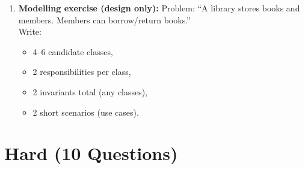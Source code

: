 \documentclass[11pt,a4paper]{article}
\begin{document}
\begin{enumerate}[label=M\arabic*., leftmargin=*]
  \item \textbf{Modelling exercise (design only):} Problem: ``A library stores books and members. Members can borrow/return books.''\\
    Write:
    \begin{itemize}[leftmargin=*]
      \item 4--6 candidate classes,
      \item 2 responsibilities per class,
      \item 2 invariants total (any classes),
      \item 2 short scenarios (use cases).
    \end{itemize}
\end{enumerate}

\section*{Hard (10 Questions)}
\end{document}
